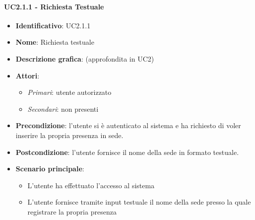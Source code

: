 \paragraph{UC2.1.1 - Richiesta Testuale}
\begin{itemize}
   \item \textbf{Identificativo}: UC2.1.1
   \item \textbf{Nome}: Richiesta testuale
   \item \textbf{Descrizione grafica}: (approfondita in UC2)
   \item \textbf{Attori}:
   \begin{itemize} 
       \item \textit{Primari}: utente autorizzato
       \item \textit{Secondari}: non presenti
   \end{itemize}
       \item \textbf{Precondizione}: l'utente si è autenticato al sistema e ha richiesto di voler inserire la propria presenza in sede. 
       \item \textbf{Postcondizione}: l'utente fornisce il nome della sede in formato testuale. 
    \item \textbf{Scenario principale}: 
       \begin{itemize}
           \item L'utente ha effettuato l'accesso al sistema 
           \item L'utente fornisce tramite input testuale il nome della sede presso la quale registrare la propria presenza
       \end{itemize}
\end{itemize}

